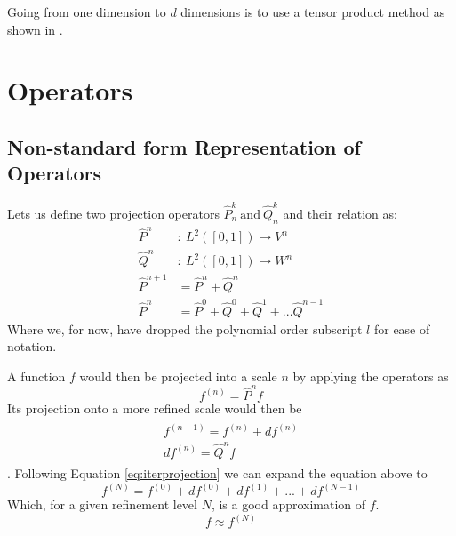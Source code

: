 \documentclass[../master_thesis.tex]{subfiles}
\begin{document}
Going from one dimension to $d$ dimensions is to use a tensor product method as shown in
\cite{Frediani:2013}.
\section{Operators}
\subsection{Non-standard form Representation of Operators}\label{NSformsec}
Lets us define two projection operators $\hat{P}^k_n \ \text{and}\ \hat{Q}^k_n $  and their relation as:
\begin{align}
  \hat{P}^n &: \ L^2([0, 1]) \to V^n \\
  \hat{Q}^n &:\  L^2([0, 1]) \to W^n \\
  \hat{P}^{n+1} &= \hat{P}^n + \hat{Q}^n\\
  \hat{P}^n &= \hat{P}^0 + \hat{Q}^0 + \hat{Q}^1 + ...  \hat{Q}^{n-1}\label{eq:iterprojection}
\end{align}
Where we, for now, have dropped the polynomial order subscript $l$ for ease of
notation.

A function $f$ would then be projected into a scale $n$ by applying the
operators as \cite{Frediani:2013}
\begin{equation}
   f^{(n)} = \hat{P}^n f
\end{equation}
Its projection onto a more refined scale would then be \cite{Frediani:2013}
\begin{align}\label{eq:refinef}
  \begin{split}
    f^ {(n+1)} = f^{(n)} + df^{(n)}\\
    df^{(n)} = \hat{Q}^nf
  \end{split}
\end{align}.
Following Equation \ref{eq:iterprojection} we can expand the equation above to
\begin{equation}
  f^{(N)} = f^{(0)} + df^{(0)} + df^{(1)} + ... + df^{(N-1)}
\end{equation}
Which, for a given refinement level $N$, is a good approximation of $f$.
\begin{equation}
  f \approx f^{(N)}
\end{equation}
\end{document}
